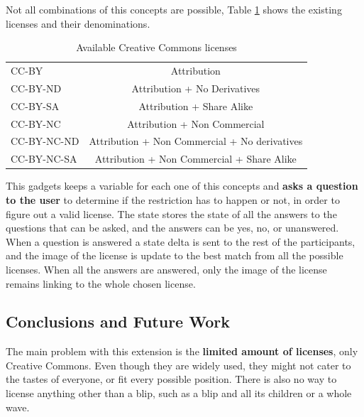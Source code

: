 Not all combinations of this concepts are possible, Table \ref{fig:cc_licenses} shows the existing licenses and their denominations.
\begin{table}[H]
  \begin{center}
    \begin{tabular}{ | l | c |}
      \hline
      CC-BY & Attribution\\
      CC-BY-ND & Attribution + No Derivatives\\      
      CC-BY-SA & Attribution + Share Alike\\
      CC-BY-NC & Attribution + Non Commercial\\
      CC-BY-NC-ND & Attribution + Non Commercial + No derivatives\\
      CC-BY-NC-SA & Attribution + Non Commercial + Share Alike\\
      \hline
    \end{tabular}
  \end{center}
  \caption{Available Creative Commons licenses}
  \label{fig:cc_licenses}
\end{table}
This gadgets keeps a variable for each one of this concepts and \textbf{asks a question to the user} to determine if the restriction has to happen or not, in order to figure out a valid license. The state stores the state of all the answers to the questions that can be asked, and the answers can be yes, no, or unanswered. When a question is answered a state delta is sent to the rest of the participants, and the image of the license is update to the best match from all the possible licenses. When all the answers are answered, only the image of the license remains linking to the whole chosen license.\\[.2cm]
\subsection{Conclusions and Future Work}
The main problem with this extension is the \textbf{limited amount of licenses}, only Creative Commons. Even though they are widely used, they might not cater to the tastes of everyone, or fit every possible position. There is also no way to license anything other than a blip, such as a blip and all its children or a whole wave.
\newpage
